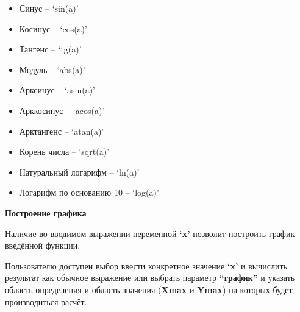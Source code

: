 \documentclass[]{article}
\begin{document}
\begin{itemize}
\item

  Синус -- `sin(a)'

\item

  Косинус -- `cos(a)'

\item

  Тангенс -- `tg(a)'

\item

  Модуль -- `abs(a)'

\item

  Арксинус -- `asin(a)'

\item

  Арккосинус -- `acos(a)'

\item

  Арктангенс -- `atan(a)'

\item

  Корень числа -- `sqrt(a)'

\item

  Натуральный логарифм -- `ln(a)'

\item

  Логарифм по основанию 10 -- `log(a)'

\end{itemize}
\pagebreak[10]
\huge
\textbf{Построение графика}
\newline

\LARGE
Наличие
во вводимом выражении переменной \textbf{`x'} позволит построить график
введённой функции.

Пользователю доступен выбор ввести конкретное значение \textbf{`x'} и
вычислить результат как обычное выражение или выбрать параметр
\textbf{``график''} и указать область определения и область значения
(\textbf{Xmax} и \textbf{Ymax}) на которых будет производиться расчёт.
\end{document}
